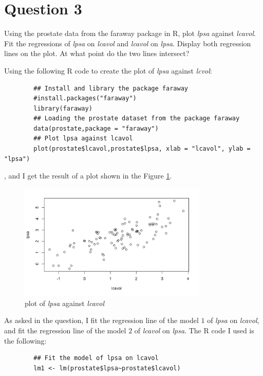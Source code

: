 \section{Question 3}

\begin{question}
    Using the prostate data from the faraway package in R, plot \textit{lpsa} against \textit{lcavol}. Fit the regressions of \textit{lpsa} on \textit{lcavol} and \textit{lcavol} on \textit{lpsa}. Display both regression lines on the plot.
At what point do the two lines intersect?
\end{question}

\begin{answer}
    Using the following R code to create the plot of \textit{lpsa} against \textit{lcvol}:
    \begin{verbatim}
        ## Install and library the package faraway
        #install.packages("faraway")
        library(faraway)
        ## Loading the prostate dataset from the package faraway
        data(prostate,package = "faraway")
        ## Plot lpsa against lcavol
        plot(prostate$lcavol,prostate$lpsa, xlab = "lcavol", ylab = "lpsa")
    \end{verbatim}
    , and I get the result of a plot shown in the Figure \ref{fig:fig1}.
    \begin{figure}[H]
        \centering
        \includegraphics[width=0.8\textwidth]{Figure 1.png}
        \caption{\label{fig:fig1}plot of \textit{lpsa} against \textit{lcavol}}
    \end{figure}
    As asked in the question, I fit the regression line of the model $1$ of \textit{lpsa} on \textit{lcavol}, and fit the regression line of the model $2$ of \textit{lcavol} on \textit{lpsa}. The R code I used is the following:
    \begin{verbatim}
        ## Fit the model of lpsa on lcavol
        lm1 <- lm(prostate$lpsa~prostate$lcavol)

\end{verbatim}
\end{answer}
